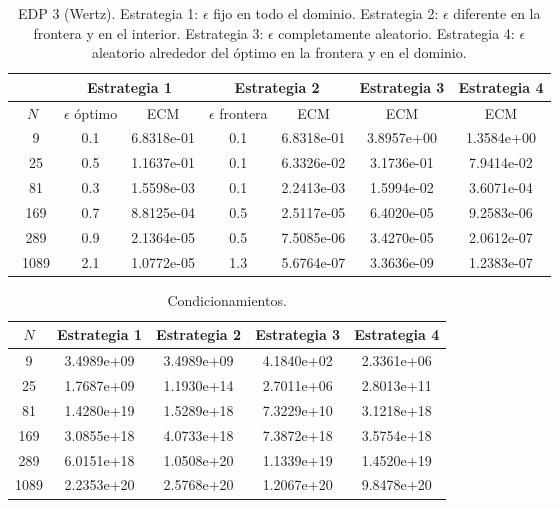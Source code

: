 \documentclass[11pt,a4paper]{article}
\begin{document}
\begin{table}
\begin{center}
\caption{EDP 3 (Wertz). Estrategia 1: $\epsilon$ fijo en todo el dominio. Estrategia 2: $\epsilon$ diferente en la frontera y en el interior. Estrategia 3: $\epsilon$ completamente aleatorio. Estrategia 4: $\epsilon$ aleatorio alrededor del óptimo en la frontera y en el dominio. }
\begin{tabular}{|c|cc|cc|c|c|}
\hline
 & \multicolumn{2}{c|}{Estrategia 1} & \multicolumn{2}{c|}{Estrategia 2} & Estrategia 3 & Estrategia 4\\
\hline
$N$ & $\epsilon$ óptimo & ECM & $\epsilon$ frontera & ECM &  ECM & ECM  \\
\hline
\ 9 & 0.1 &6.8318e-01 & 0.1 &  6.8318e-01& 3.8957e+00  &  1.3584e+00\\
\ 25 & 0.5 & 1.1637e-01 & 0.1 & 6.3326e-02 & 3.1736e-01 & 7.9414e-02\\
\ 81 & 0.3 & 1.5598e-03 & 0.1 & 2.2413e-03 & 1.5994e-02 & 3.6071e-04 \\ 
\  169 & 0.7 & 8.8125e-04 & 0.5 & 2.5117e-05 & 6.4020e-05 & 9.2583e-06 \\ 
\ 289 & 0.9 & 2.1364e-05 & 0.5 & 7.5085e-06 &3.4270e-05 & 2.0612e-07\\
\ 1089 & 2.1 & 1.0772e-05 & 1.3 & 5.6764e-07 & 3.3636e-09 &  1.2383e-07\\
\hline 
\end{tabular}
\end{center}
\end{table}


\begin{table}
\begin{center}
\caption{Condicionamientos. }
\begin{tabular}{|c|c|c|c|c|}
\hline
 $N$& Estrategia 1 & Estrategia 2 & Estrategia 3 & Estrategia 4 \\
\hline
9 &  3.4989e+09 &  3.4989e+09&  4.1840e+02   & 2.3361e+06 \\
25 & 1.7687e+09 & 1.1930e+14 & 2.7011e+06 & 2.8013e+11 \\
81 & 1.4280e+19 & 1.5289e+18 & 7.3229e+10& 3.1218e+18 \\
169 & 3.0855e+18 & 4.0733e+18 & 7.3872e+18 & 3.5754e+18 \\
289 & 6.0151e+18 & 1.0508e+20 & 1.1339e+19 & 1.4520e+19 \\
1089 & 2.2353e+20 & 2.5768e+20 & 1.2067e+20 &  9.8478e+20 \\
\hline
\end{tabular}
\end{center}
\end{table}
\end{document}
